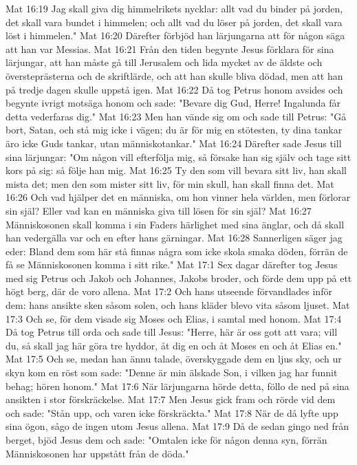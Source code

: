 Mat 16:19  Jag skall giva dig himmelrikets nycklar: allt vad du binder på jorden, det skall vara bundet i himmelen; och allt vad du löser på jorden, det skall vara löst i himmelen."
Mat 16:20  Därefter förbjöd han lärjungarna att för någon säga att han var Messias.
Mat 16:21  Från den tiden begynte Jesus förklara för sina lärjungar, att han måste gå till Jerusalem och lida mycket av de äldste och översteprästerna och de skriftlärde, och att han skulle bliva dödad, men att han på tredje dagen skulle uppstå igen.
Mat 16:22  Då tog Petrus honom avsides och begynte ivrigt motsäga honom och sade: "Bevare dig Gud, Herre! Ingalunda får detta vederfaras dig."
Mat 16:23  Men han vände sig om och sade till Petrus: "Gå bort, Satan, och stå mig icke i vägen; du är för mig en stötesten, ty dina tankar äro icke Guds tankar, utan människotankar."
Mat 16:24  Därefter sade Jesus till sina lärjungar: "Om någon vill efterfölja mig, så försake han sig själv och tage sitt kors på sig: så följe han mig.
Mat 16:25  Ty den som vill bevara sitt liv, han skall mista det; men den som mister sitt liv, för min skull, han skall finna det.
Mat 16:26  Och vad hjälper det en människa, om hon vinner hela världen, men förlorar sin själ? Eller vad kan en människa giva till lösen för sin själ?
Mat 16:27  Människosonen skall komma i sin Faders härlighet med sina änglar, och då skall han vedergälla var och en efter hans gärningar.
Mat 16:28  Sannerligen säger jag eder: Bland dem som här stå finnas några som icke skola smaka döden, förrän de få se Människosonen komma i sitt rike."
Mat 17:1  Sex dagar därefter tog Jesus med sig Petrus och Jakob och Johannes, Jakobs broder, och förde dem upp på ett högt berg, där de voro allena.
Mat 17:2  Och hans utseende förvandlades inför dem: hans ansikte sken såsom solen, och hans kläder blevo vita såsom ljuset.
Mat 17:3  Och se, för dem visade sig Moses och Elias, i samtal med honom.
Mat 17:4  Då tog Petrus till orda och sade till Jesus: "Herre, här är oss gott att vara; vill du, så skall jag här göra tre hyddor, åt dig en och åt Moses en och åt Elias en."
Mat 17:5  Och se, medan han ännu talade, överskyggade dem en ljus sky, och ur skyn kom en röst som sade: "Denne är min älskade Son, i vilken jag har funnit behag; hören honom."
Mat 17:6  När lärjungarna hörde detta, föllo de ned på sina ansikten i stor förskräckelse.
Mat 17:7  Men Jesus gick fram och rörde vid dem och sade: "Stån upp, och varen icke förskräckta."
Mat 17:8  När de då lyfte upp sina ögon, sågo de ingen utom Jesus allena.
Mat 17:9  Då de sedan gingo ned från berget, bjöd Jesus dem och sade: "Omtalen icke för någon denna syn, förrän Människosonen har uppstått från de döda."
